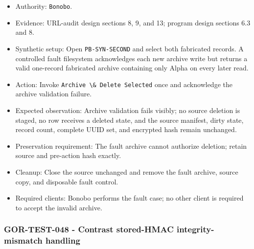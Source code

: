 \documentclass[
  letterpaper,
]{article}
\newcommand{\passthrough}[1]{#1}
\providecommand{\tightlist}{%
  \setlength{\itemsep}{0pt}\setlength{\parskip}{0pt}}
\begin{document}
\begin{itemize}
\tightlist
\item
  Authority: \passthrough{\lstinline!Bonobo!}.
\item
  Evidence: URL-audit design sections 8, 9, and 13; program design sections 6.3 and 8.
\item
  Synthetic setup: Open \nolinkurl{PB-SYN-SECOND} and select both fabricated records. A controlled fault filesystem
  acknowledges each new archive write but returns a valid one-record fabricated archive containing only Alpha on every
  later read.
\item
  Action: Invoke \passthrough{\lstinline!Archive \& Delete Selected!} once and acknowledge the archive validation
  failure.
\item
  Expected observation: Archive validation fails visibly; no source deletion is staged, no row receives a deleted state,
  and the source manifest, dirty state, record count, complete UUID set, and encrypted hash remain unchanged.
\item
  Preservation requirement: The fault archive cannot authorize deletion; retain source and pre-action hash exactly.
\item
  Cleanup: Close the source unchanged and remove the fault archive, source copy, and disposable fault control.
\item
  Required clients: Bonobo performs the fault case; no other client is required to accept the invalid archive.
\end{itemize}

\subsubsection{GOR-TEST-048 - Contrast stored-HMAC integrity-mismatch
handling}\label{gor-test-048---contrast-stored-hmac-integrity-mismatch-handling}
\end{document}
